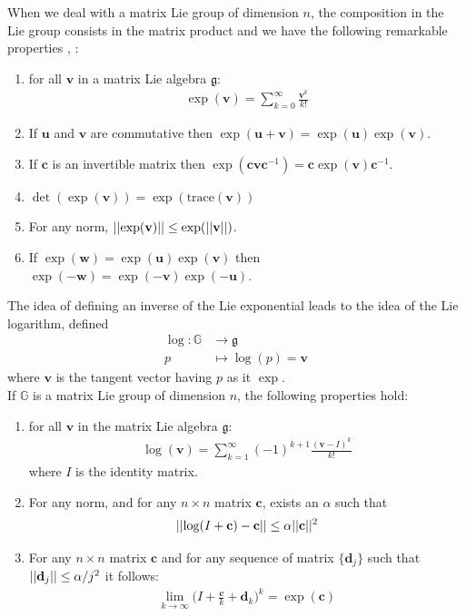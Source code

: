 When we deal with a matrix Lie group of dimension $n$, the composition in the Lie group consists in the matrix product and we have the following remarkable properties \cite{hall2015lie}, \cite{kirillov2008introduction}:
\begin{enumerate}
	\item for all $\mathbf{v}$ in a matrix Lie algebra $\mathfrak{g}$:
	\begin{align}\label{eq:exp_as_inf_sum}
	\exp(\mathbf{v}) = \sum_{k=0}^{\infty} \frac{\mathbf{v}^{k}}{k!}
	\end{align}
	\item If $\mathbf{u}$ and $\mathbf{v}$ are commutative then $\exp(\mathbf{u} + \mathbf{v}) = \exp(\mathbf{u})\exp(\mathbf{v})$.
	\item If $\mathbf{c}$ is an invertible matrix then $\exp(\mathbf{c}\mathbf{v}\mathbf{c}^{-1}) = \mathbf{c}\exp(\mathbf{v})\mathbf{c}^{-1}$.
	\item $\det(\exp(\mathbf{v})) = \exp(\text{trace}(\mathbf{v}))$
	\item For any norm, $\vert\lvert \exp(\mathbf{v}) \rvert\vert \leq \exp(\vert\lvert \mathbf{v} \rvert\vert)$.
	\item If $\exp(\mathbf{w}) = \exp(\mathbf{u})  \exp(\mathbf{v})$ then $\exp(\mathbf{-w}) = \exp(\mathbf{-v}) \exp(\mathbf{-u})$.
\end{enumerate}
The idea of defining an inverse of the Lie exponential leads to the idea of the Lie logarithm, defined
\begin{align*}
\log : \mathbb{G} & \longrightarrow \mathfrak{g} \\
p &\longmapsto \log (p)  =  \mathbf{v}   
\end{align*}
where $\mathbf{v}  $ is the tangent vector having $p$ as it $\exp$.\\

\noindent
If $\mathbb{G}$ is a matrix Lie group of dimension $n$, the following properties hold:
\begin{enumerate}
	\item for all $\mathbf{v}$ in the matrix Lie algebra $\mathfrak{g}$:
	\begin{align}\label{eq:log_as_inf_sum}
	\log(\mathbf{v}) = \sum_{k=1}^{\infty}(-1)^{k+1} \frac{(\mathbf{v}-I)^{k} }{k!}
	\end{align}
	where $I$ is the identity matrix.
	\item For any norm, and for any $n\times n$ matrix $\mathbf{c}$, exists an $\alpha$ such that 
	\begin{align*}
	\vert\lvert  \log(I + \mathbf{c}) - \mathbf{c}  \rvert\vert  \leq \alpha \vert\lvert  \mathbf{c} \rvert\vert^{2}
	\end{align*}
	\item For any $n\times n$ matrix $\mathbf{c}$ and for any sequence of matrix $\{\mathbf{d}_{j}\}$ such that  $\vert\lvert  \mathbf{d}_{j} \rvert\vert \leq \alpha/j^2$ it follows:
	\begin{align*}
	\lim_{k\rightarrow \infty} \big( I + \frac{\mathbf{c}}{k} + \mathbf{d}_{k} \big)^{k} = \exp{(\mathbf{c})}
	\end{align*}
\end{enumerate} 

